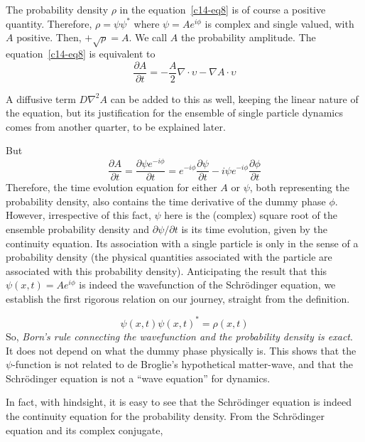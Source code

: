 The probability density $\rho$ in the equation~\ref{c14-eq8} is of course a positive quantity. Therefore,
$\rho = \psi \psi^{\ast}$ where $\psi = Ae^{i\phi}$ is complex and single valued, with $A$ positive. Then, $+\sqrt{\rho} = A$.
We call $A$ the probability amplitude. The equation~\ref{c14-eq8} is equivalent to
\begin{equation*}
\frac{\partial A}{\partial t} = -\frac{A}{2} \nabla \cdot \upsilon - \nabla A \cdot \upsilon \tag{10}\label{c14-eq10}
\end{equation*}

A diffusive term $D \nabla^2 A$ can be added to this as well, keeping the linear nature of the equation,
but its justification for the ensemble of single particle dynamics comes from another quarter,
to be explained later.

But
{\fontsize{9}{9}\selectfont\begin{equation*}
\frac{\partial A}{\partial t} = \frac{\partial \psi e^{-i \phi}}{\partial t} = e^{-i \phi} \frac{\partial \psi}{\partial t} -  i \psi e^{-i \phi} \frac{\partial \phi}{\partial t}  \tag{11}\label{c14-eq11}
\end{equation*}}
Therefore, the time evolution equation for either $A$ or $\psi$, both representing the probability
density, also contains the time derivative of the dummy phase $\phi$. However, irrespective
of this fact, $\psi$ here is the (complex) square root of the ensemble probability density and
$\partial \psi /\partial t$ is its time evolution, given by the continuity equation. Its association with a single
particle is only in the sense of a probability density (the physical quantities associated with
the particle are associated with this probability density). Anticipating the result that this
$\psi (x, t) = Ae^{i \phi}$ is indeed the wavefunction of the Schr\"{o}dinger equation, we establish the first
rigorous relation on our journey, straight from the definition.

{\fontsize{9}{9}\selectfont\begin{equation*}
\psi (x, t) \psi (x, t)^{\ast} = \rho(x, t) \tag{12}\label{c14-eq12}
\end{equation*}}
So, \textit{Born's rule connecting the wavefunction and the probability density is exact}. It does
not depend on what the dummy phase physically is.
This shows that the $\psi$-function is not related to de Broglie’s hypothetical matter-wave, and that the Schr\"{o}dinger equation is not
a ``wave equation'' for dynamics.

In fact, with hindsight, it is easy to see that the Schr\"{o}dinger equation is indeed the
continuity equation for the probability density. From the Schr\"{o}dinger equation and its
complex conjugate,

